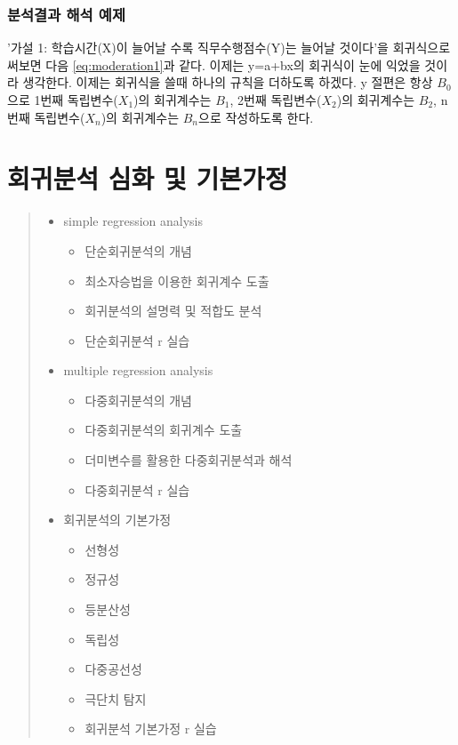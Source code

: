 \documentclass[
]{book}
\providecommand{\tightlist}{%
  \setlength{\itemsep}{0pt}\setlength{\parskip}{0pt}}
\begin{document}
\subsection{분석결과 해석 예제}\label{uxbd84uxc11duxacb0uxacfc-uxd574uxc11d-uxc608uxc81c-1}

'가설 1: 학습시간(X)이 늘어날 수록 직무수행점수(Y)는 늘어날 것이다'을 회귀식으로 써보면 다음 \eqref{eq:moderation1}과 같다. 이제는 y=a+bx의 회귀식이 눈에 익었을 것이라 생각한다. 이제는 회귀식을 쓸때 하나의 규칙을 더하도록 하겠다. y 절편은 항상 \(B_{0}\)으로 1번째 독립변수(\(X_{1}\))의 회귀계수는 \(B_{1}\), 2번째 독립변수(\(X_{2}\))의 회귀계수는 \(B_{2}\), n번째 독립변수(\(X_{n}\))의 회귀계수는 \(B_{n}\)으로 작성하도록 한다.

\chapter{회귀분석 심화 및 기본가정}\label{regression}

\begin{quote}
\begin{itemize}
\tightlist
\item
  simple regression analysis

  \begin{itemize}
  \tightlist
  \item
    단순회귀분석의 개념
  \item
    최소자승법을 이용한 회귀계수 도출
  \item
    회귀분석의 설명력 및 적합도 분석
  \item
    단순회귀분석 r 실습
  \end{itemize}
\item
  multiple regression analysis

  \begin{itemize}
  \tightlist
  \item
    다중회귀분석의 개념
  \item
    다중회귀분석의 회귀계수 도출
  \item
    더미변수를 활용한 다중회귀분석과 해석
  \item
    다중회귀분석 r 실습
  \end{itemize}
\item
  회귀분석의 기본가정

  \begin{itemize}
  \tightlist
  \item
    선형성
  \item
    정규성
  \item
    등분산성
  \item
    독립성
  \item
    다중공선성
  \item
    극단치 탐지
  \item
    회귀분석 기본가정 r 실습
  \end{itemize}
\end{itemize}
\end{quote}
\end{document}
